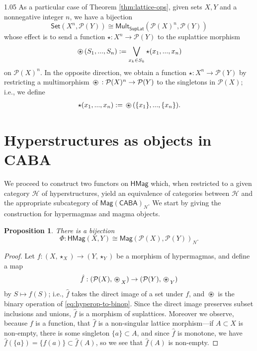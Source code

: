 \documentclass[reqno]{amsart}
\newcommand{\ostar}{%
  \mathbin{%
    \tikz[baseline=(s.base)]{
      \node (s) at (0,0) {$\star$};
      \draw[line width=0.4pt] (s.center) circle[radius=0.82ex];
    }%
  }%
}
\newcommand{\pow}{\mathcal{P}}
\newcommand{\cat}{\mathsf}
\numberwithin{equation}{section}
\theoremstyle{plain}
\newtheorem{proposition}[equation]{Proposition}
\theoremstyle{definition}
\begin{document}
\begin{spacing}{1.05}
As a particular case of Theorem \ref{thm:lattice-ops}, given sets $X,Y$ and a nonnegative integer $n$, we have a bijection \begin{equation*}
    \cat{Set}(X^n,\pow(Y)) \cong \cat{Mult}_\cat{SupLat}(\pow(X)^n, \pow(Y))
\end{equation*} whose effect is to send a function $\star : X^n \to \pow(Y)$ to the suplattice morphism \begin{equation} \label{eq:hyperop-to-binop} \ostar(S_1,...,S_n) := \bigvee_{x_k \in S_k} \star(x_1,...,x_n) \end{equation} on $\pow(X)^n$. In the opposite direction, we obtain a function $\star : X^n \to \pow(Y)$ by restricting a multimorphism ${\ostar : \pow(X)^{n} \to \pow(Y)}$ to the singletons in $\pow(X)$; i.e., we define \begin{equation} \label{eq:binop-to-hyperop}
    \star(x_1,...,x_n) := \ostar(\{x_1\},...,\{x_n\}).
\end{equation}

\section{Hyperstructures as objects in CABA} We proceed to construct two functors on $\cat{HMag}$ which, when restricted to a given category $\mathcal{H}$ of hyperstructures, yield an equivalence of categories between $\mathcal{H}$ and the appropriate subcategory of $\cat{Mag}(\cat{CABA})_N$. We start by giving the construction for hypermagmas and magma objects.

\begin{proposition} \label{prop:hmag-mag-morphisms}
    There is a bijection $$\Phi : \cat{HMag}(X,Y) \cong \cat{Mag}(\pow(X),\pow(Y))_N.$$
\end{proposition}

\begin{proof}
    Let $f : (X, \star_X) \to (Y, \star_Y)$ be a morphism of hypermagmas, and define a map $${\hat{f} : (\pow(X),\ostar_X) \to (\pow(Y), \ostar_Y)}$$ by $S \mapsto f(S)$; i.e., $\hat{f}$ takes the direct image of a set under $f$, and $\ostar$ is the binary operation of \ref{eq:hyperop-to-binop}. Since the direct image preserves subset inclusions and unions, $\hat{f}$ is a morphism of suplattices. Moreover we observe, because $f$ is a function, that $\hat{f}$ is a non-singular lattice morphism---if $A \subset X$ is non-empty, there is some singleton $\{a\} \subset A$, and since $\hat{f}$ is monotone, we have $\hat{f}(\{a\}) = \{f(a)\} \subset \hat{f}(A)$, so we see that $\hat{f}(A)$ is non-empty. 
    

\end{proof}
\end{spacing}
\end{document}
